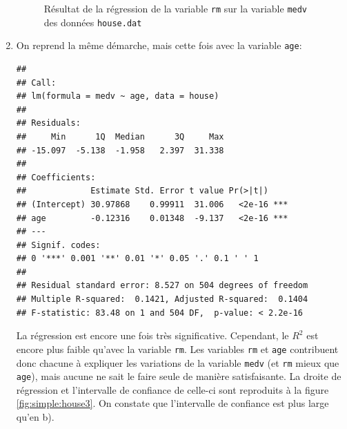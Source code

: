 \begin{solution}{2.17}
\begin{enumerate}
\begin{figure}
\begin{knitrout}
\end{knitrout}
        \caption{Résultat de la régression de la variable \texttt{rm} sur la variable \texttt{medv} des données \texttt{house.dat}}
        \label{fig:simple:house2}
      \end{figure}
    \item On reprend la même démarche, mais cette fois avec la
      variable \texttt{age}:
\begin{knitrout}
\color{fgcolor}\begin{kframe}
\begin{alltt}
 \hlkwb{<-}  \hlopt{~}   
\end{alltt}
\begin{verbatim}
##
## Call:
## lm(formula = medv ~ age, data = house)
##
## Residuals:
##     Min      1Q  Median      3Q     Max
## -15.097  -5.138  -1.958   2.397  31.338
##
## Coefficients:
##             Estimate Std. Error t value Pr(>|t|)
## (Intercept) 30.97868    0.99911  31.006   <2e-16 ***
## age         -0.12316    0.01348  -9.137   <2e-16 ***
## ---
## Signif. codes:
## 0 '***' 0.001 '**' 0.01 '*' 0.05 '.' 0.1 ' ' 1
##
## Residual standard error: 8.527 on 504 degrees of freedom
## Multiple R-squared:  0.1421,	Adjusted R-squared:  0.1404
## F-statistic: 83.48 on 1 and 504 DF,  p-value: < 2.2e-16
\end{verbatim}
\begin{alltt}
 \hlkwb{<-}   \hlstd{=} \hlstd{,}  \hlstd{=} \hlstd{)}
\end{alltt}
\end{kframe}
\end{knitrout}
      La régression est encore une fois très significative. Cependant,
      le $R^2$ est encore plus faible qu'avec la variable
      \texttt{rm}. Les variables \texttt{rm} et \texttt{age}
      contribuent donc chacune à expliquer les variations de la
      variable \texttt{medv} (et \texttt{rm} mieux que \texttt{age}),
      mais aucune ne sait le faire seule de manière satisfaisante. La
      droite de régression et l'intervalle de confiance de celle-ci
      sont reproduits à la figure \ref{fig:simple:house3}. On constate
      que l'intervalle de confiance est plus large qu'en b).
      \begin{figure}
\begin{knitrout}

\end{knitrout}
\end{figure}
\end{enumerate}
\end{solution}

